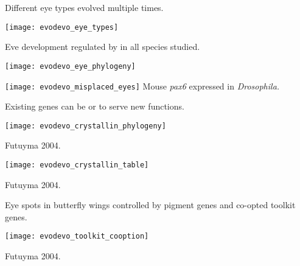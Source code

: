 \documentclass[t,handout]{beamer}  %
\newcommand{\backskip}{\vspace{-0.5\baselineskip}}
\begin{document}

\begin{frame}{Different eye types evolved multiple times.}

\backskip

\centering

\texttt{[image: evodevo\_eye\_types]}

\end{frame}


\begin{frame}{Eve development regulated by  in all species studied.}

\backskip

\begin{multicols}{2}

\texttt{[image: evodevo\_eye\_phylogeny]}

\columnbreak

\texttt{[image: evodevo\_misplaced\_eyes]}\newline
\footnotesize Mouse \emph{pax6} expressed in \textit{Drosophila.}

\end{multicols}


\end{frame}


\begin{frame}{Existing genes can be  or  to serve new functions.}

\backskip

\texttt{[image: evodevo\_crystallin\_phylogeny]}

\tinyfill Futuyma 2004.

\end{frame}


\begin{frame}

\centering

\texttt{[image: evodevo\_crystallin\_table]}

\tinyfill Futuyma 2004.

\end{frame}


\begin{frame}{Eye spots in butterfly wings controlled by pigment genes and co-opted toolkit genes.}


\texttt{[image: evodevo\_toolkit\_cooption]}

\tinyfill Futuyma 2004.
\end{frame}
\end{document}
